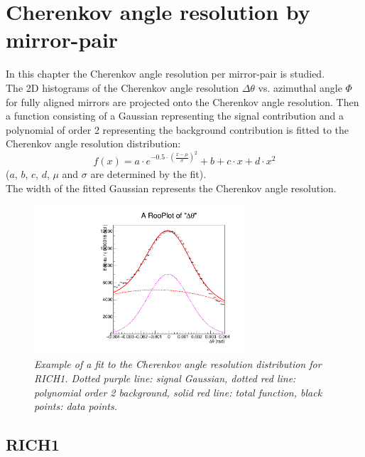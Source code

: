 \chapter{Cherenkov angle resolution by mirror-pair}
In this chapter the Cherenkov angle resolution per mirror-pair is studied.\\
The 2D histograms of the Cherenkov angle resolution $\Delta \theta$ vs. azimuthal angle $\Phi$ for fully aligned mirrors are projected onto the Cherenkov angle resolution. Then a function consisting of a Gaussian representing the signal contribution and a polynomial of order 2 representing the background contribution is fitted to the Cherenkov angle resolution distribution: 
\begin{equation}
f(x) = a \cdot e^{-0.5 \cdot \left( \frac{x - \mu}{\sigma}\right)^2} + b + c \cdot x + d \cdot x^2
\label{eq:1}
\end{equation}
($a$, $b$, $c$, $d$, $\mu$ and $\sigma$ are determined by the fit).\\
The width of the fitted Gaussian represents the Cherenkov angle resolution.\\
\begin{figure}[!h]
	\vspace*{-0.cm}
	\begin{center}
		\includegraphics[width=0.7\textwidth]{rootest.pdf}
		\vspace*{-1.cm}
	\end{center}
	\caption{\textit{Example of a fit to the Cherenkov angle resolution distribution for RICH1. Dotted purple line: signal Gaussian, dotted red line: polynomial order 2 background,  solid red line: total function, black points: data points.} }
	\label{fig:fitfunc}
\end{figure}

\section{RICH1}

